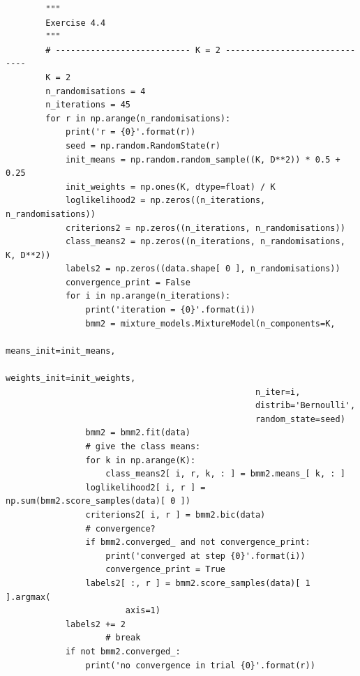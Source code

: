 \begin{verbatim}
        """
        Exercise 4.4
        """
        # --------------------------- K = 2 ------------------------------
        K = 2
        n_randomisations = 4
        n_iterations = 45
        for r in np.arange(n_randomisations):
            print('r = {0}'.format(r))
            seed = np.random.RandomState(r)
            init_means = np.random.random_sample((K, D**2)) * 0.5 + 0.25
            init_weights = np.ones(K, dtype=float) / K
            loglikelihood2 = np.zeros((n_iterations, n_randomisations))
            criterions2 = np.zeros((n_iterations, n_randomisations))
            class_means2 = np.zeros((n_iterations, n_randomisations, K, D**2))
            labels2 = np.zeros((data.shape[ 0 ], n_randomisations))
            convergence_print = False
            for i in np.arange(n_iterations):
                print('iteration = {0}'.format(i))
                bmm2 = mixture_models.MixtureModel(n_components=K,
                                                  means_init=init_means,
                                                  weights_init=init_weights,
                                                  n_iter=i,
                                                  distrib='Bernoulli',
                                                  random_state=seed)
                bmm2 = bmm2.fit(data)
                # give the class means:
                for k in np.arange(K):
                    class_means2[ i, r, k, : ] = bmm2.means_[ k, : ]
                loglikelihood2[ i, r ] = np.sum(bmm2.score_samples(data)[ 0 ])
                criterions2[ i, r ] = bmm2.bic(data)
                # convergence?
                if bmm2.converged_ and not convergence_print:
                    print('converged at step {0}'.format(i))
                    convergence_print = True
                labels2[ :, r ] = bmm2.score_samples(data)[ 1 ].argmax(
                        axis=1)
            labels2 += 2
                    # break
            if not bmm2.converged_:
                print('no convergence in trial {0}'.format(r))


\end{verbatim}
